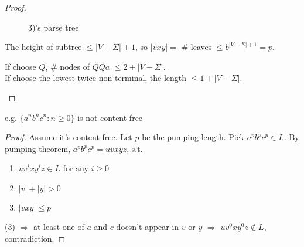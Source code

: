 \begin{proof}
\begin{enumerate}
\begin{figure}[!htb]
            \caption{3)'s parse tree}
        \end{figure}

        The height of subtree $\le |V-\Sigma|+1$, so $|vxy|=$ \# leaves $\le b^{|V-\Sigma|+1}=p$.

        If choose $Q$, \# nodes of $QQa$ $\le 2+|V-\Sigma|$. \\
        If choose the lowest twice non-terminal, the length $\le 1+|V-\Sigma|$. 
    \end{enumerate}
\end{proof}

e.g. $\{ a^nb^nc^n:n\ge 0 \}$ is not content-free
\begin{proof}
    Assume it's content-free. Let $p$ be the pumping length. Pick $a^pb^pc^p\in L$. By pumping theorem, $a^pb^pc^p=uvxyz$, s.t. 
    \begin{enumerate}
        \item $uv^ixy^iz\in L$ for any $i\ge 0$
        \item $|v|+|y|>0$
        \item $|vxy|\le p$
    \end{enumerate}
    (3) $\Rightarrow$ at least one of $a$ and $c$ doesn't appear in $v$ or $y$ $\Rightarrow$ $uv^0xy^0z\notin L$, contradiction.  
\end{proof}
